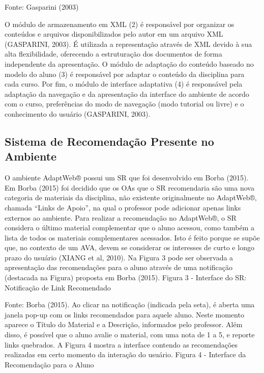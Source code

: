 Fonte: Gasparini (2003)

O módulo de armazenamento em XML (2) é responsável por organizar os conteúdos e arquivos disponibilizados pelo autor em um arquivo XML (GASPARINI, 2003). É utilizada a representação através de XML devido à sua alta flexibilidade, oferecendo a estruturação dos documentos de forma independente da apresentação.
O módulo de adaptação do conteúdo baseado no modelo do aluno (3) é responsável por adaptar o conteúdo da disciplina para cada curso. Por fim, o módulo de interface adaptativa (4) é responsável pela adaptação da navegação e da apresentação da interface do ambiente de acordo com o curso, preferências do modo de navegação (modo tutorial ou livre) e o conhecimento do usuário (GASPARINI, 2003).

\subsection{Sistema de Recomendação Presente no Ambiente}

O ambiente AdaptWeb® possui um SR que foi desenvolvido em Borba (2015). Em Borba (2015) foi decidido que os OAs que o SR recomendaria são uma nova categoria de materiais da disciplina, não existente originalmente no AdaptWeb®, chamada “Links de Apoio”, na qual o professor pode adicionar apenas links externos ao ambiente.
Para realizar a recomendação no AdaptWeb®, o SR considera o último material complementar que o aluno acessou, como também a lista de todos os materiais complementares acessados. Isto é feito porque se supõe que, no contexto de um AVA, devem se considerar os interesses de curto e longo prazo do usuário (XIANG et al, 2010).
Na Figura 3 pode ser observada a apresentação das recomendações para o aluno através de uma notificação (destacada na Figura) proposta em Borba (2015).
Figura 3 - Interface do SR: Notificação de Link Recomendado

Fonte: Borba (2015).
Ao clicar na notificação (indicada pela seta), é aberta uma janela pop-up com os links recomendados para aquele aluno. Neste momento aparece o Título do Material e a Descrição, informados pelo professor. Além disso, é possível que o aluno avalie o material, com uma nota de 1 a 5, e reporte links quebrados. A Figura 4 mostra a interface contendo as recomendações realizadas em certo momento da interação do usuário.
Figura 4 - Interface da Recomendação para o Aluno

